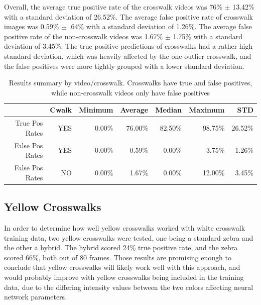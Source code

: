 Overall, the average true positive rate of the crosswalk videos was 76\% $\pm$ 13.42\% with a standard deviation of 26.52\%. The average false positive rate of crosswalk images was 0.59\% $\pm$ .64\% with a standard deviation of 1.26\%. The average false positive rate of the non-crosswalk videos was 1.67\% $\pm$ 1.75\% with a standard deviation of 3.45\%.
The true positive predictions of crosswalks had a rather high standard deviation, which was heavily affected by the one outlier crosswalk, and the false positives were more tightly grouped with a lower standard deviation.

\begin{table}[t]
    \begin{longtable}{|r|r|r|r|r|r|r|}
    \caption[Results summary by video/crosswalk]{Results summary by video/crosswalk. Crosswalks have true and false positives, while non-crosswalk videos only have false positives}
    \label{tab:crosswalkResultsSummary}\\
    \hline
          & Cwalk & Minimum & Average & Median & Maximum & STD \bigstrut\\
    \hline
    True Pos Rates & YES   & 0.00\% & 76.00\% & 82.50\% & 98.75\% & 26.52\% \bigstrut\\
    \hline
    False Pos Rates & YES   & 0.00\% & 0.59\% & 0.00\% & 3.75\% & 1.26\% \bigstrut\\
    \hline
    False Pos Rates & NO    & 0.00\% & 1.67\% & 0.00\% & 12.00\% & 3.45\% \bigstrut\\
    \hline
    \end{longtable}
\end{table}



\subsection{Yellow Crosswalks}

In order to determine how well yellow crosswalks worked with white crosswalk training data, two yellow crosswalks were tested, one being a standard zebra and the other a hybrid. The hybrid scored 24\% true positive rate, and the zebra scored 66\%, both out of 80 frames. Those results are promising enough to conclude that yellow crosswalks will likely work well with this approach, and would probably improve with yellow crosswalks being included in the training data, due to the differing intensity values between the two colors affecting neural network parameters. 

